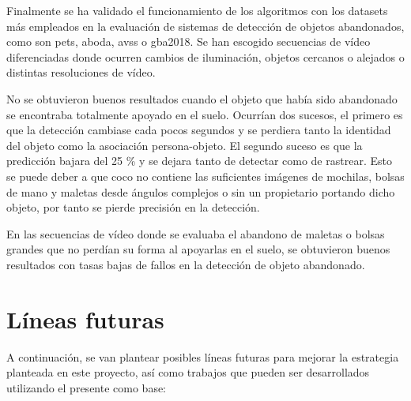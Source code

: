 Finalmente se ha validado el funcionamiento de los algoritmos con los datasets más empleados en la evaluación de sistemas de detección de objetos abandonados, como son \gls{pets}, \gls{aboda}, \gls{avss} o \gls{gba2018}. Se han escogido secuencias de vídeo diferenciadas donde ocurren cambios de iluminación, objetos cercanos o alejados o distintas resoluciones de vídeo.

No se obtuvieron buenos resultados cuando el objeto que había sido abandonado se encontraba totalmente apoyado en el suelo. Ocurrían dos sucesos, el primero es que la detección cambiase cada pocos segundos y se perdiera tanto la identidad del objeto como la asociación persona-objeto. El segundo suceso es que la predicción bajara del 25 \% y se dejara tanto de detectar como de rastrear. Esto se puede deber a que \gls{coco} no contiene las suficientes imágenes de mochilas, bolsas de mano y maletas desde ángulos complejos o sin un propietario portando dicho objeto, por tanto se pierde precisión en la detección.

En las secuencias de vídeo donde se evaluaba el abandono de maletas o bolsas grandes que no perdían su forma al apoyarlas en el suelo, se obtuvieron buenos resultados con tasas bajas de fallos en la detección de objeto abandonado.

\section{Líneas futuras}
\label{sec:lineas-futuras}

A continuación, se van plantear posibles líneas futuras para mejorar la estrategia planteada en este proyecto, así como trabajos que pueden ser desarrollados utilizando el presente como base: 

